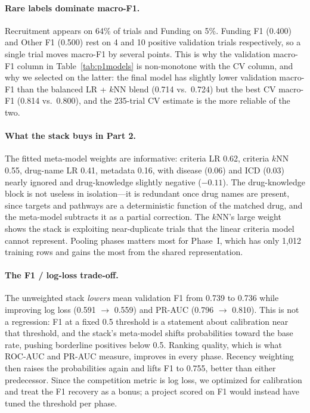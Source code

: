 \paragraph{Rare labels dominate macro-F1.}
Recruitment appears on 64\% of trials and Funding on 5\%. Funding F1 (0.400) and
Other F1 (0.500) rest on 4 and 10 positive validation trials respectively, so a
single trial moves macro-F1 by several points. This is why the validation macro-F1
column in Table~\ref{tab:p1models} is non-monotone with the CV column, and why we
selected on the latter: the final model has slightly lower validation macro-F1
than the balanced LR + $k$NN blend (0.714 vs.\ 0.724) but the best CV macro-F1
(0.814 vs.\ 0.800), and the 235-trial CV estimate is the more reliable of the two.

\paragraph{What the stack buys in Part 2.}
The fitted meta-model weights are informative: criteria LR 0.62, criteria $k$NN
0.55, drug-name LR 0.41, metadata 0.16, with disease (0.06) and ICD (0.03) nearly
ignored and drug-knowledge slightly negative ($-0.11$). The drug-knowledge block
is not useless in isolation---it is redundant once drug names are present, since
targets and pathways are a deterministic function of the matched drug, and the
meta-model subtracts it as a partial correction. The $k$NN's large weight shows
the stack is exploiting near-duplicate trials that the linear criteria model
cannot represent. Pooling phases matters most for Phase~I, which has only 1,012
training rows and gains the most from the shared representation.

\paragraph{The F1 / log-loss trade-off.}
The unweighted stack \emph{lowers} mean validation F1 from 0.739 to 0.736 while
improving log loss (0.591 $\to$ 0.559) and PR-AUC (0.796 $\to$ 0.810). This is not
a regression: F1 at a fixed 0.5 threshold is a statement about calibration near
that threshold, and the stack's meta-model shifts probabilities toward the base
rate, pushing borderline positives below 0.5. Ranking quality, which is what
ROC-AUC and PR-AUC measure, improves in every phase. Recency weighting then raises
the probabilities again and lifts F1 to 0.755, better than either predecessor.
Since the competition metric is log loss, we optimized for calibration and treat
the F1 recovery as a bonus; a project scored on F1 would instead have tuned the
threshold per phase.

